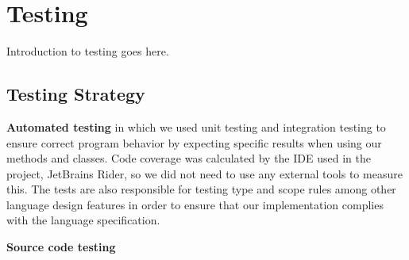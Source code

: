 \chapter{Testing}

Introduction to testing goes here.

\section{Testing Strategy}
\textbf{Automated testing} in which we used unit testing and integration testing to ensure correct program behavior by expecting specific results when using our methods and classes. 
Code coverage was calculated by the IDE used in the project, JetBrains Rider, so we did not need to use any external tools to measure this\cite{rider_test_coverage}.
The tests are also responsible for testing type and scope rules among other language design features in order to ensure that our implementation complies with the language specification.

\textbf{Source code testing}


